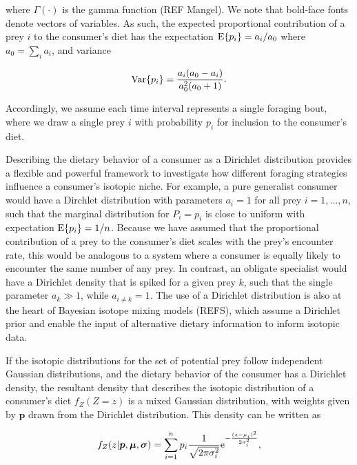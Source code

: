 \documentclass{frontiersSCNS}
\begin{document}
\noindent where $\Gamma(\cdot)$ is the gamma function (REF Mangel).
We note that bold-face fonts denote vectors of variables.
As such, the expected proportional contribution of a prey $i$ to the consumer's diet has the expectation ${\rm E}\{p_i\}=a_i/a_0$ where $a_0 = \sum_i a_i$, and variance

\begin{equation}
  \label{eqDirVar}
  {\rm Var}\{p_i\} = \frac{a_i(a_0 - a_i)}{a_0^2(a_0 + 1)}.
\end{equation}

\noindent Accordingly, we assume each time interval represents a single foraging bout, where we draw a single prey $i$ with probability $p_i$ for inclusion to the consumer's diet.

Describing the dietary behavior of a consumer as a Dirichlet distribution provides a flexible and powerful framework to investigate how different foraging strategies influence a consumer's isotopic niche.
For example, a pure generalist consumer would have a Dirchlet distribution with parameters $a_i = 1$ for all prey $i=1,...,n$, such that the marginal distribution for $P_i = p_i$ is close to uniform with expectation ${\rm E}\{p_i\} = 1/n$.
Because we have assumed that the proportional contribution of a prey to the consumer's diet scales with the prey's encounter rate, this would be analogous to a system where a consumer is equally likely to encounter the same number of any prey.
In contrast, an obligate specialist would have a Dirichlet density that is spiked for a given prey $k$, such that the single parameter $a_k \gg 1$, while $a_{i \neq k} = 1$.
The use of a Dirichlet distribution is also at the heart of Bayesian isotope mixing models (REFS), which assume a Dirichlet prior and enable the input of alternative dietary information to inform isotopic data.



If the isotopic distributions for the set of potential prey follow independent Gaussian distributions, and the dietary behavior of the consumer has a Dirichlet density, the resultant density that describes the isotopic distribution of a consumer's diet $f_Z(Z=z)$ is a mixed Gaussian distribution, with weights given by $\bm p$ drawn from the Dirichlet distribution.
This density can be written as

\begin{equation}
  \label{eqfZ}
f_Z(z|{\bm p},{\bm \mu},{\bm \sigma}) = \sum_{i=1}^n p_i\frac{1}{\sqrt{2 \pi \sigma_i^2}}{\rm e}^{-\frac{(z-\mu_i)^2}{2\sigma_i^2}},
\end{equation}
\end{document}
